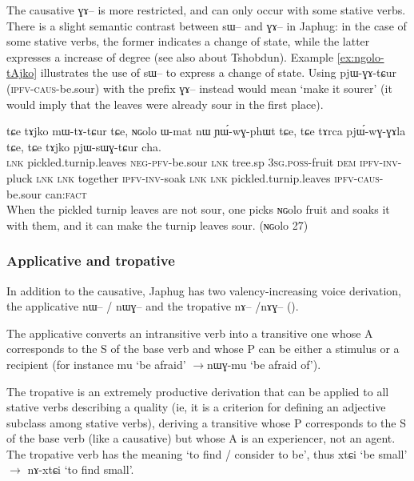 \documentclass[oldfontcommands,oneside,a4paper,11pt]{article}
\newcommand{\ipa}[1]{{\phon#1}} %
\begin{document}
The causative \ipa{ɣɤ--} is more restricted, and can only occur with some stative verbs. There is a slight semantic contrast between \ipa{sɯ--} and \ipa{ɣɤ--} in Japhug: in the case of some stative verbs, the former indicates a change of state, while the latter expresses a increase of degree (see also \citealt{jackson06paisheng} about Tshobdun). Example \ref{ex:ngolo-tAjko}  illustrates the use of \ipa{sɯ--} to express a change of state. Using \ipa{pjɯ-ɣɤ-tɕur} (\textsc{ipfv-caus}-be.sour) with the prefix \ipa{ɣɤ--} instead would mean `make it sourer' (it would imply that the leaves were already sour in the first place).

 \begin{exe}
\ex \label{ex:ngolo-tAjko}
\gll
\ipa{tɕe} 	\ipa{tɤjko} 	\ipa{mɯ-tɤ-tɕur} 	\ipa{tɕe,} 	\ipa{ɴɢolo} 	\ipa{ɯ-mat} 	\ipa{nɯ} 	\ipa{ɲɯ́-wɣ-phɯt} 	\ipa{tɕe,} 	\ipa{tɕe} 	\ipa{tɤrca} 	\ipa{pjɯ́-wɣ-ɣɤla} 	\ipa{tɕe,} 	\ipa{tɕe} 	\ipa{tɤjko} 	\ipa{pjɯ-sɯɣ-tɕur} 	\ipa{cha.} \\ 
\textsc{lnk} pickled.turnip.leaves \textsc{neg-pfv}-be.sour \textsc{lnk} tree.sp \textsc{3sg.poss}-fruit \textsc{dem} \textsc{ipfv-inv}-pluck \textsc{lnk} \textsc{lnk} together \textsc{ipfv-inv}-soak \textsc{lnk} \textsc{lnk}  pickled.turnip.leaves \textsc{ipfv-caus}-be.sour  can:\textsc{fact} \\
 \glt When the pickled turnip leaves are not sour, one picks \ipa{ɴɢolo} fruit and soaks it with them, and it can make the turnip leaves sour.   (\ipa{ɴɢolo} 27)
   \end{exe}

\subsubsection{Applicative and tropative}
In addition to the causative, Japhug has two valency-increasing voice derivation, the applicative \ipa{nɯ--} / \ipa{nɯɣ--} and the tropative \ipa{nɤ--} /\ipa{nɤɣ--} (\citealt{jacques13tropative}).

The applicative converts an intransitive verb into a transitive one whose A corresponds to the S of the base verb and whose P can be either a stimulus or a recipient (for instance \ipa{mu} `be afraid' $\rightarrow$\ipa{nɯɣ-mu} `be afraid of'). 

The tropative is an extremely productive derivation that can be applied to all stative verbs describing a quality (ie, it is a criterion for defining an adjective subclass among stative verbs), deriving a transitive whose P corresponds to the S of the base verb (like a causative) but whose A is an experiencer, not an agent. The tropative verb has the meaning `to find / consider to be', thus \ipa{xtɕi} `be small' $\rightarrow$ \ipa{nɤ-xtɕi} `to find small'.
\end{document}
